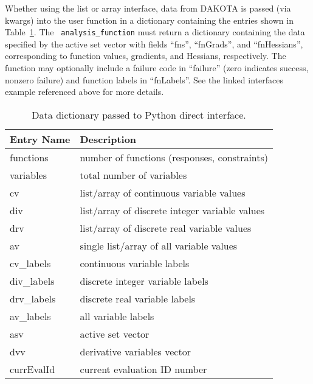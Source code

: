 Whether using the list or array interface, data from DAKOTA is passed
(via kwargs) into the user function in a dictionary containing the
entries shown in Table~\ref{advint:table:pythonparams}.  The {\tt
analysis\_function} must return a dictionary containing the data
specified by the active set vector with fields ``fns'', ``fnGrads'',
and ``fnHessians'', corresponding to function values, gradients, and
Hessians, respectively.  The function may optionally include a failure
code in ``failure'' (zero indicates success, nonzero failure) and
function labels in ``fnLabels''.  See the linked interfaces example
referenced above for more details.

\begin{table}
\centering
\caption{Data dictionary passed to Python direct interface.}
\label{advint:table:pythonparams}\vspace{2mm}
\begin{tabular}{|l|l|}
\hline
\textbf{Entry Name} & \textbf{Description}  \\
\hline
functions  & number of functions (responses, constraints) \\
variables  & total number of variables \\
cv         & list/array of continuous variable values \\
div        & list/array of discrete integer variable values \\
drv        & list/array of discrete real variable values \\
av         & single list/array of all variable values \\
cv\_labels  & continuous variable labels \\
div\_labels & discrete integer variable labels \\
drv\_labels & discrete real variable labels \\
av\_labels  & all variable labels \\
asv        & active set vector \\
dvv        & derivative variables vector \\
currEvalId & current evaluation ID number \\
\hline
\end{tabular}
\end{table}
